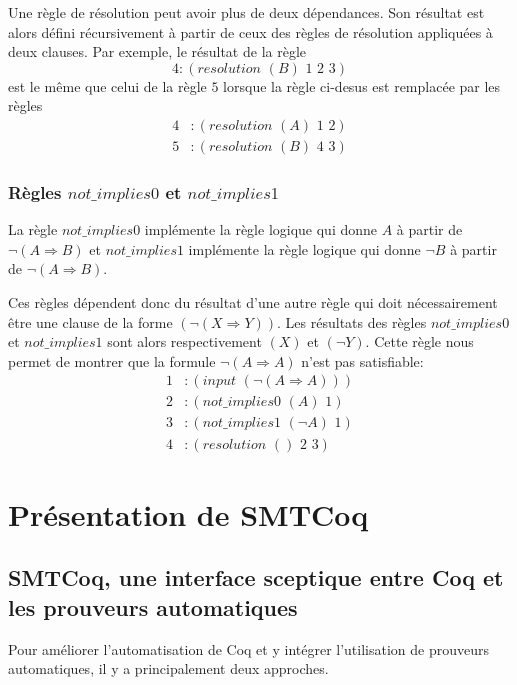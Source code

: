 \documentclass[11pt]{article}
\begin{document}
Une règle de résolution peut avoir plus de deux dépendances. Son résultat est alors défini récursivement à partir de ceux des règles de résolution appliquées à deux clauses. Par exemple, le résultat de la règle \[4:(resolution \,\,(B) \,\,1\,\, 2\,\,3) \]
est le même que celui de la règle $5$ lorsque la règle ci-desus est remplacée par les règles
\begin{align*}
4&:(resolution \,\,(A) \,\,1\,\, 2) \\
5&:(resolution \,\,(B) \,\,4\,\, 3) 
\end{align*}

\subsubsection{Règles $not\_implies0$ et $not\_implies1$} \label{not_implies}
La règle $not\_implies0$ implémente la règle logique qui donne $A$ à partir de $\neg (A \Rightarrow B)$ et $not\_implies1$ implémente la règle logique qui donne $\neg B$ à partir de $\neg (A \Rightarrow B)$. \medbreak

Ces règles dépendent donc du résultat d'une autre règle qui doit nécessairement être une clause de la forme $(\neg (X \Rightarrow Y))$. Les résultats des règles $not\_implies0$ et $not\_implies1$ sont alors respectivement $(X)$ et $(\neg Y)$. Cette règle nous permet de montrer que la formule $\neg (A \Rightarrow A)$ n'est pas satisfiable:
\begin{align*}
  1&:(input\,\, (\neg ( A \Rightarrow A))) \\
  2&:(not\_implies0\,\, (A)\,\, 1) \\
  3&:(not\_implies1\,\, (\neg A) \,\,1) \\
  4&:(resolution\,\, ()\,\, 2\,\, 3)
\end{align*}


\section{Présentation de SMTCoq} \label{pres_smtcoq}

\subsection{SMTCoq, une interface sceptique entre Coq et les prouveurs automatiques}\label{sceptique_autarcique}

Pour améliorer l'automatisation de Coq et y intégrer l'utilisation de prouveurs automatiques, il y a principalement deux approches.
\end{document}
